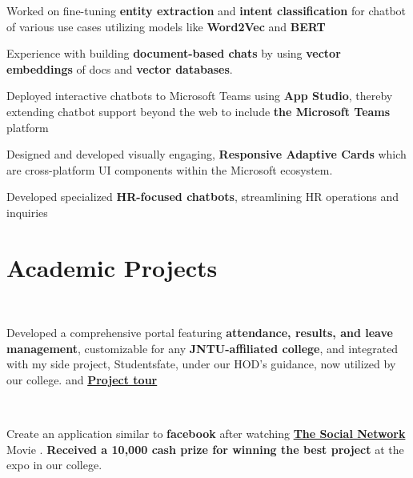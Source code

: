 \documentclass{deedy-resume-openfont}
\begin{document}
\begin{minipage}[t]{0.66\textwidth}
\descript{  }
\begin{tightemize}
\item  Worked on fine-tuning \textbf{entity extraction} and \textbf{intent classification} for chatbot of various use cases utilizing models like \textbf{Word2Vec} and \textbf{BERT}
\item Experience with building \textbf{document-based chats} by using \textbf{vector embeddings} of docs and \textbf{vector databases}.
\item Deployed interactive chatbots to Microsoft Teams using \textbf{App Studio}, thereby extending chatbot support beyond the web to include \textbf{the Microsoft Teams} platform
\item Designed and developed visually engaging, \textbf{Responsive Adaptive Cards} which are cross-platform UI components within the Microsoft ecosystem.
\end{tightemize}

\begin{tightemize}
\item Developed specialized \textbf{HR-focused chatbots}, streamlining HR operations and inquiries
\end{tightemize}
\sectionsep


\section{Academic Projects}
\\
\begin{tightemize}
\item Developed a comprehensive portal featuring \textbf{attendance, results, and leave management}, customizable for any \textbf{JNTU-affiliated college}, and integrated with my side project, Studentsfate, under our HOD's guidance, now utilized by our college.  and \textbf{\href{https://www.youtube.com/watch?v=SD9KdLAw1OI}{Project tour}}
\end{tightemize}
\sectionsep

\\
\begin{tightemize}
\item Create an application similar to \textbf{facebook} after watching \textbf{\href{https://www.imdb.com/title/tt1285016/}{The Social Network}} Movie {}. \textbf{Received a {}10,000 cash prize for winning the best project} at the expo in our college.
\end{tightemize}
\sectionsep
\nocite{*}

\end{minipage} 
\end{document}
